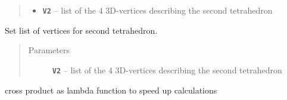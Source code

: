 \documentclass[letterpaper,10pt,english]{sphinxmanual}
\begin{document}
\begin{fulllineitems}
\begin{fulllineitems}
\begin{quote}
\begin{description}
\begin{itemize}
\item {} 
\textbf{\texttt{V2}} -- list of the 4 3D-vertices describing the second tetrahedron

\end{itemize}

\end{description}\end{quote}

\end{fulllineitems}


\begin{fulllineitems}
\label{pk_src.collision_tet_tet:pk_src.collision_tet_tet.Collision_tet_tet.setV2}
Set list of vertices for second tetrahedron.
\begin{quote}\begin{description}
\item[{Parameters}] \leavevmode
\textbf{\texttt{V2}} -- list of the 4 3D-vertices describing the second tetrahedron

\end{description}\end{quote}

\end{fulllineitems}


\begin{fulllineitems}
\label{pk_src.collision_tet_tet:pk_src.collision_tet_tet.Collision_tet_tet.shifts}
\end{fulllineitems}


\end{fulllineitems}


\begin{fulllineitems}
\label{pk_src.collision_tet_tet:pk_src.collision_tet_tet.cross}
cross product as lambda function to speed up calculations

\end{fulllineitems}

\end{document}
